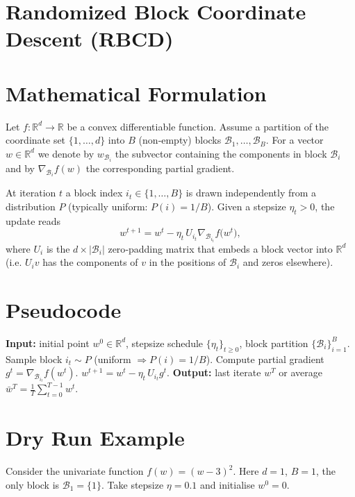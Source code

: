 \documentclass[11pt]{article}
\newcommand{\R}{\mathbb{R}}
\begin{document}
\section*{Randomized Block Coordinate Descent (RBCD)}

\section*{Mathematical Formulation}
Let $f:\R^{d}\rightarrow\R$ be a convex differentiable function.
Assume a partition of the coordinate set $\{1,\dots ,d\}$ into $B$ (non‑empty) blocks 
$\mathcal{B}_{1},\dots ,\mathcal{B}_{B}$.
For a vector $w\in\R^{d}$ we denote by $w_{\mathcal{B}_{i}}$ the subvector
containing the components in block $\mathcal{B}_{i}$ and by 
$\nabla_{\mathcal{B}_{i}} f(w)$ the corresponding partial gradient.

At iteration $t$ a block index $i_{t}\in\{1,\dots ,B\}$ is drawn 
independently from a distribution $P$ (typically uniform:
$P(i)=1/B$).  
Given a stepsize $\eta_{t}>0$, the update reads
\[
w^{t+1}=w^{t}-\eta_{t}\,U_{i_{t}}\nabla_{\mathcal{B}_{i_{t}}} f\bigl(w^{t}\bigr),
\tag{1}
\]
where $U_{i}$ is the $d\times |\mathcal{B}_{i}|$ zero‑padding matrix that
embeds a block vector into $\R^{d}$ (i.e. $U_{i}v$ has the components of $v$ in
the positions of $\mathcal{B}_{i}$ and zeros elsewhere).

\section*{Pseudocode}
\begin{algorithm}[H]
\caption{Randomized Block Coordinate Descent}
\begin{algorithmic}[1]
\STATE \textbf{Input:} initial point $w^{0}\in\R^{d}$, stepsize schedule
$\{\eta_{t}\}_{t\ge0}$, block partition $\{\mathcal{B}_{i}\}_{i=1}^{B}$.
    \STATE Sample block $i_{t}\sim P$ (uniform $\Rightarrow P(i)=1/B$).
    \STATE Compute partial gradient $g^{t}= \nabla_{\mathcal{B}_{i_{t}}} f(w^{t})$.
    \STATE $w^{t+1}= w^{t}-\eta_{t}\,U_{i_{t}} g^{t}$.
\ENDFOR
\STATE \textbf{Output:} last iterate $w^{T}$ or average $\bar w^{T}=\frac1T\sum_{t=0}^{T-1} w^{t}$.
\end{algorithmic}
\end{algorithm}

\section*{Dry Run Example}
Consider the univariate function $f(w)=(w-3)^{2}$.
Here $d=1$, $B=1$, the only block is $\mathcal{B}_{1}=\{1\}$.
Take stepsize $\eta=0.1$ and initialise $w^{0}=0$.
\end{document}
